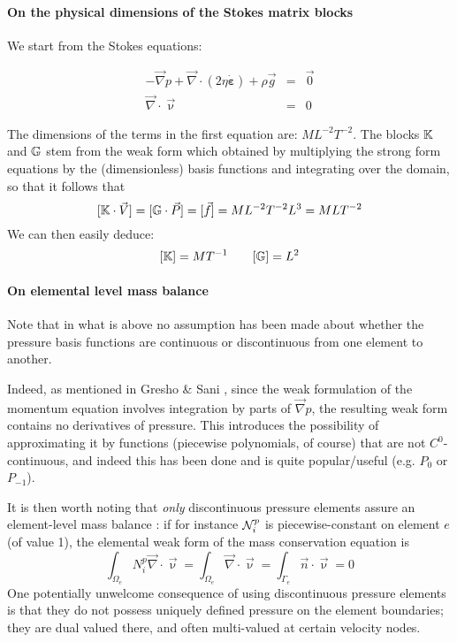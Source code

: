 \paragraph{On the physical dimensions of the Stokes matrix blocks}
We start from the Stokes equations:

\begin{eqnarray}
- {\vec \nabla p} + {\vec \nabla} \cdot (2 \eta \dot{\bm \varepsilon} ) + \rho \vec{g} &=& \vec{0}  \\
\vec \nabla \cdot \vec \upnu &=& 0 
\end{eqnarray}

The dimensions of the terms in the first equation are: $ML^{-2}T^{-2}$. The blocks ${\mathbb{K}}$ and ${\mathbb{G}}$
stem from the weak form which obtained by multiplying the strong form equations by the (dimensionless)
basis functions and integrating over the domain, so that it follows that 
\[
[ {\mathbb{K}} \cdot \vec V] = [{\mathbb{G}} \cdot \vec P] = [\vec f] = ML^{-2}T^{-2} L^3 = MLT^{-2} 
\]
We can then easily deduce:
\[
[{\mathbb{K}}]=MT^{-1}
\quad
\quad
[{\mathbb{G}}]=L^2
\]

\paragraph{On elemental level mass balance}
Note that in what is above no assumption has been made about whether 
the pressure basis functions are continuous or discontinuous from one 
element to another. 

Indeed, as mentioned in Gresho \& Sani \cite{grsa}, since the 
weak formulation of the momentum equation involves
integration by parts of ${\vec \nabla }p$, the resulting weak form contains 
no derivatives of pressure. This introduces the possibility of approximating it
by functions (piecewise polynomials, of course) that are not $C^0$-continuous, 
and indeed this has been done and is quite popular/useful (e.g. $P_0$ or $P_{-1}$). 

It is then worth noting that {\sl only} discontinuous pressure 
elements assure an element-level mass balance \cite{grsa}:
if for instance ${\mathcal{N}}_i^p$ is piecewise-constant on element $e$ (of value 1), the 
elemental weak form of the mass conservation equation is 
\[
\int_{\Omega_e} N_i^p {\vec \nabla} \cdot {\vec \upnu} = 
\int_{\Omega_e} {\vec \nabla} \cdot {\vec \upnu} = 
\int_{\Gamma_e} {\vec n} \cdot {\vec \upnu} = 0
\]
One potentially unwelcome consequence of using 
discontinuous pressure elements is that they 
do not possess uniquely defined pressure 
on the element boundaries; they are dual valued there, 
and often multi-valued at certain velocity nodes. 

